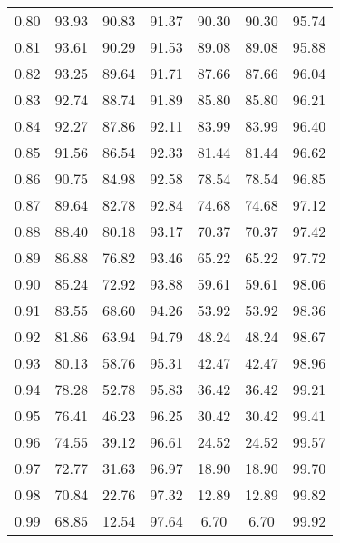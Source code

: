 \begin{tabular}{|c|c|c|c|c|c|c|}
      0.80 &     93.93 &     90.83 &      91.37 &   90.30 &      90.30 &         95.74 \\
      0.81 &     93.61 &     90.29 &      91.53 &   89.08 &      89.08 &         95.88 \\
      0.82 &     93.25 &     89.64 &      91.71 &   87.66 &      87.66 &         96.04 \\
      0.83 &     92.74 &     88.74 &      91.89 &   85.80 &      85.80 &         96.21 \\
      0.84 &     92.27 &     87.86 &      92.11 &   83.99 &      83.99 &         96.40 \\
      0.85 &     91.56 &     86.54 &      92.33 &   81.44 &      81.44 &         96.62 \\
      0.86 &     90.75 &     84.98 &      92.58 &   78.54 &      78.54 &         96.85 \\
      0.87 &     89.64 &     82.78 &      92.84 &   74.68 &      74.68 &         97.12 \\
      0.88 &     88.40 &     80.18 &      93.17 &   70.37 &      70.37 &         97.42 \\
      0.89 &     86.88 &     76.82 &      93.46 &   65.22 &      65.22 &         97.72 \\
      0.90 &     85.24 &     72.92 &      93.88 &   59.61 &      59.61 &         98.06 \\
      0.91 &     83.55 &     68.60 &      94.26 &   53.92 &      53.92 &         98.36 \\
      0.92 &     81.86 &     63.94 &      94.79 &   48.24 &      48.24 &         98.67 \\
      0.93 &     80.13 &     58.76 &      95.31 &   42.47 &      42.47 &         98.96 \\
      0.94 &     78.28 &     52.78 &      95.83 &   36.42 &      36.42 &         99.21 \\
      0.95 &     76.41 &     46.23 &      96.25 &   30.42 &      30.42 &         99.41 \\
      0.96 &     74.55 &     39.12 &      96.61 &   24.52 &      24.52 &         99.57 \\
      0.97 &     72.77 &     31.63 &      96.97 &   18.90 &      18.90 &         99.70 \\
      0.98 &     70.84 &     22.76 &      97.32 &   12.89 &      12.89 &         99.82 \\
      0.99 &     68.85 &     12.54 &      97.64 &    6.70 &       6.70 &         99.92 \\
\bottomrule
\end{tabular}
